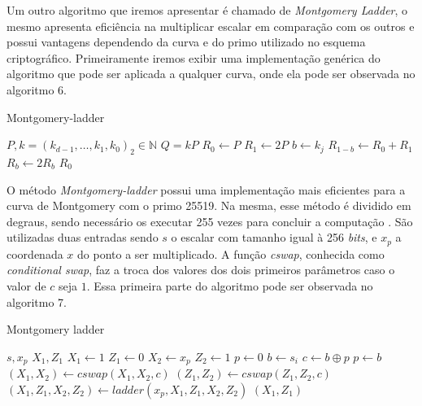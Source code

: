 Um outro algoritmo que iremos apresentar é chamado de \textit{Montgomery Ladder}, o mesmo apresenta eficiência na multiplicar escalar em comparação com os outros e possui vantagens dependendo da curva e do primo utilizado no esquema criptográfico. Primeiramente iremos exibir uma implementação genérica do algoritmo que pode ser aplicada a qualquer curva, onde ela pode ser observada no algoritmo 6.

\begin{algorithm}[H]
\caption{Montgomery-ladder}
\begin{algorithmic} 
    \REQUIRE $P, k=(k_{d-1},\ldots,k_1,k_0)_2 \in \mathbb{N}$
    \ENSURE $Q = kP$
    \STATE $R_0 \leftarrow P$
    \STATE $R_1 \leftarrow 2P$
        \STATE $b \leftarrow k_j$
        \STATE $R_{1-b} \leftarrow R_0 + R_1$
        \STATE $R_b \leftarrow 2R_b$
    \ENDFOR
    \RETURN $R_0$
    \end{algorithmic}
\end{algorithm}

O método \textit{Montgomery-ladder} possui uma implementação mais eficientes para a curva de Montgomery com o primo 25519. Na mesma, esse método é dividido em degraus, sendo necessário os executar 255 vezes para concluir a computação \cite{Dull:2015:HCM:2834659.2834708}. São utilizadas duas entradas sendo $s$ o escalar com tamanho igual à 256 \textit{bits}, e $x_p$ a coordenada $x$ do ponto a ser multiplicado. A função \textit{cswap}, conhecida como \textit{conditional swap}, faz a troca dos valores dos dois primeiros parâmetros caso o valor de $c$ seja $1$. Essa primeira parte do algoritmo pode ser observada no algoritmo 7.

\begin{algorithm}[H]
\caption{Montgomery ladder}
\begin{algorithmic} 
    \REQUIRE $s, x_p$
    \ENSURE $X_1, Z_1$
    \STATE $X_1 \leftarrow 1$
    \STATE $Z_1 \leftarrow 0$
    \STATE $X_2 \leftarrow x_p$
    \STATE $Z_2 \leftarrow 1$
    \STATE $p \leftarrow 0$
        \STATE $b \leftarrow s_i$
        \STATE $c \leftarrow b \oplus p$
        \STATE $p \leftarrow b$
        \STATE $(X_1, X_2) \leftarrow cswap(X_1,X_2,c)$
        \STATE $(Z_1,Z_2) \leftarrow cswap(Z_1,Z_2,c)$
        \STATE $(X_1, Z_1, X_2, Z_2) \leftarrow ladder(x_p, X_1, Z_1, X_2, Z_2)$
    \ENDFOR
    \RETURN $(X_1,Z_1)$
    \end{algorithmic}
\end{algorithm}

